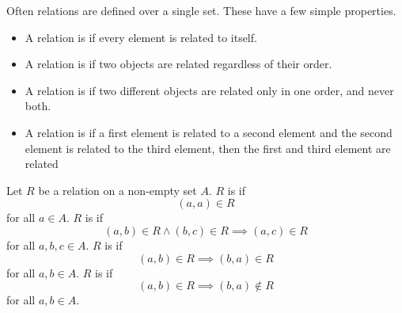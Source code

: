 
\sbasic





\sstart
{}


Often relations
are defined over a single
set.
These have a few simple
properties.


\begin{itemize}

\item
A relation is
if every element
is related to itself.

\item
A relation is
if two objects are related
regardless of their order.

\item
A relation is
if two different objects are related only
in one order, and never both.

\item
A relation is
if a first element is
related to a second element
and the second element
is related to the third element,
then the first and third
element are related
\end{itemize}


Let $R$ be a relation on
a non-empty set $A$.
$R$ is  if
$$(a, a) \in R$$
for all $a \in A$.
$R$ is  if
$$(a, b) \in R \land (b, c) \in R \implies (a, c) \in R$$
for all $a, b, c \in A$.
$R$ is  if
$$(a, b) \in R \implies (b, a) \in R$$
for all $a, b \in A$.
$R$ is  if
$$(a, b) \in R \implies (b, a) \not\in R$$
for all $a, b \in A$.

\strats
\strats

